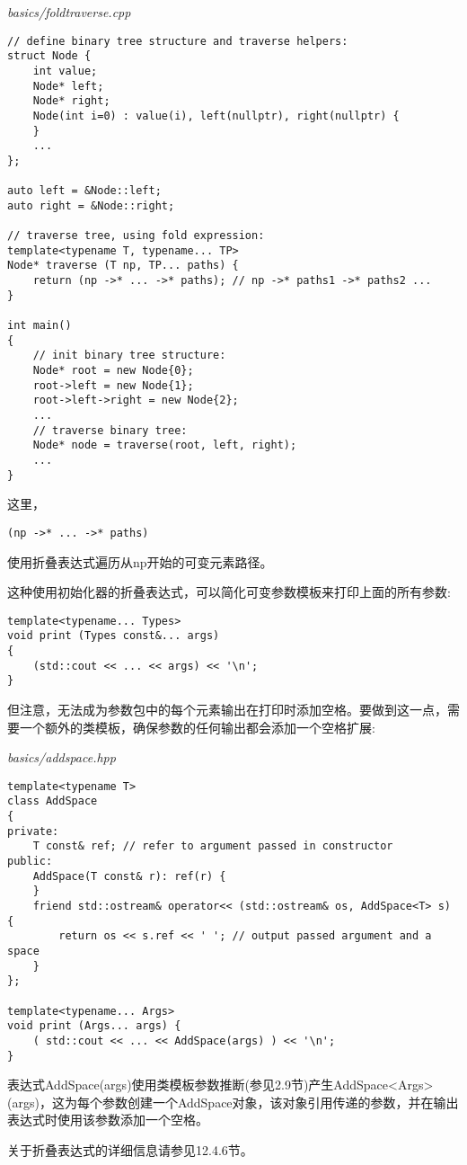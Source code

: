 \noindent
\textit{basics/foldtraverse.cpp}
\begin{lstlisting}[style=styleCXX]
// define binary tree structure and traverse helpers:
struct Node {
	int value;
	Node* left;
	Node* right;
	Node(int i=0) : value(i), left(nullptr), right(nullptr) {
	}
	...
};

auto left = &Node::left;
auto right = &Node::right;

// traverse tree, using fold expression:
template<typename T, typename... TP>
Node* traverse (T np, TP... paths) {
	return (np ->* ... ->* paths); // np ->* paths1 ->* paths2 ...
}

int main()
{
	// init binary tree structure:
	Node* root = new Node{0};
	root->left = new Node{1};
	root->left->right = new Node{2};
	...
	// traverse binary tree:
	Node* node = traverse(root, left, right);
	...
}
\end{lstlisting}

这里，

\begin{lstlisting}[style=styleCXX]
(np ->* ... ->* paths)
\end{lstlisting}

使用折叠表达式遍历从np开始的可变元素路径。

这种使用初始化器的折叠表达式，可以简化可变参数模板来打印上面的所有参数:

\begin{lstlisting}[style=styleCXX]
template<typename... Types>
void print (Types const&... args)
{
	(std::cout << ... << args) << '\n';
}
\end{lstlisting}

但注意，无法成为参数包中的每个元素输出在打印时添加空格。要做到这一点，需要一个额外的类模板，确保参数的任何输出都会添加一个空格扩展:

\noindent
\textit{basics/addspace.hpp}
\begin{lstlisting}[style=styleCXX]
template<typename T>
class AddSpace
{
private:
	T const& ref; // refer to argument passed in constructor
public:
	AddSpace(T const& r): ref(r) {
	}
	friend std::ostream& operator<< (std::ostream& os, AddSpace<T> s) {
		return os << s.ref << ' '; // output passed argument and a space
	}
};

template<typename... Args>
void print (Args... args) {
	( std::cout << ... << AddSpace(args) ) << '\n';
}
\end{lstlisting}

表达式AddSpace(args)使用类模板参数推断(参见2.9节)产生AddSpace<Args>(args)，这为每个参数创建一个AddSpace对象，该对象引用传递的参数，并在输出表达式时使用该参数添加一个空格。

关于折叠表达式的详细信息请参见12.4.6节。
































